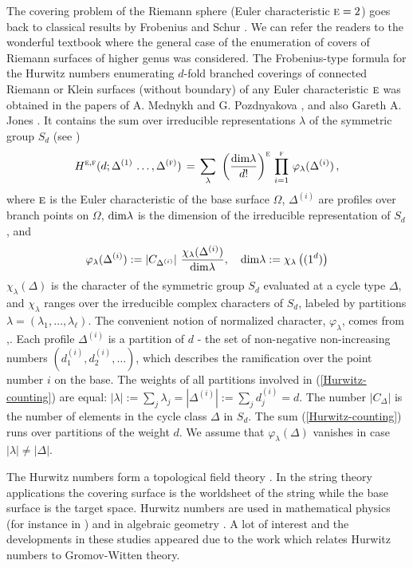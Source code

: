 \documentclass[a4paper,10pt]{article}
\theoremstyle{plain}
\theoremstyle{remark}
\def\be{\begin{equation}}
\def\ee{\end{equation}}
\begin{document}
The covering problem of the Riemann sphere (Euler characteristic $\textsc{e}=2$) goes back to classical results by Frobenius and
Schur \cite{F,FS}. We can refer the readers to the wonderful
textbook \cite{ZL} where the general case of the enumeration of covers of Riemann surfaces of higher genus was considered.
The Frobenius-type formula for the Hurwitz numbers enumerating $d$-fold branched coverings of connected Riemann or Klein
surfaces (without boundary) of any Euler characteristic $\textsc{e}$
was obtained in the papers of A. Mednykh and G. Pozdnyakova \cite{M1},\cite{M2}  and also Gareth A. Jones \cite{GARETH.A.JONES}.
 It contains the sum over irreducible representations
$\lambda$ of the symmetric group $S_d$ (see  \cite{F,FS,M1,M2,ZL,GARETH.A.JONES})
\be\label{Hurwitz-counting}
H^{\textsc{e},\textsc{f}}(d; \Delta^{(1)}\,\dots,\Delta^{(\textsc{f})})\,=\,
\sum_{\lambda} \,\,\left(\frac{{\rm dim}\lambda}{d!}\right)^\textsc{e}
\,
\prod_{i=1}^\textsc{f} \,\varphi_\lambda(\Delta^{(i)})\,,
\ee
where $\textsc{e}$ is the Euler characteristic of the base surface $\Omega$,
$\Delta^{(i)}$ are profiles  over branch points on $\Omega$,
${\rm dim}\lambda$ is the dimension of the irreducible representation of $S_d$, and
\be
\label{varphi}
\varphi_\lambda(\Delta^{(i)}) := |C_{\Delta^{(i)}}|\,\,\frac{\chi_\lambda(\Delta^{(i)})}{{\rm dim}\lambda} ,
\quad {\rm dim}\lambda:=\chi_\lambda\left((1^d)\right)
\ee
$\chi_\lambda(\Delta)$ is the character of the symmetric group $S_d$ evaluated at a cycle type $\Delta$,
and $\chi_\lambda$ ranges over the irreducible complex characters of $S_d$,
labeled by partitions $\lambda=(\lambda_1,\dots,\lambda_{\ell})$. The convenient notion of normalized character,
$\varphi_\lambda$, comes from \cite{Okounkov-2000},\cite{AMMN-2011}. Each
profile $\Delta^{(i)}$ is a partition of $d$ - the set of non-negative non-increasing numbers
$(d^{(i)}_1,d^{(i)}_2,\dots )$, which describes the ramification over the point number $i$ on the base. The weights
of all partitions involved in (\ref{Hurwitz-counting}) are equal:
$|\lambda|:=\sum_j\lambda_j=|\Delta^{(i)}|:=\sum_j d^{(i)}_j=d$. The number $|C_{\Delta}|$
is the number of elements in the cycle class $\Delta$ in $S_d$.
The sum (\ref{Hurwitz-counting}) runs over partitions of the weight $d$. We assume that
$\varphi_\lambda(\Delta)$ vanishes in case $|\lambda|\neq |\Delta|$.

The Hurwitz numbers form a topological field theory \cite{Dijkgraaf}. In the string theory applications the covering
surface is the worldsheet of the string while the base surface is the target space.
Hurwitz numbers are used in mathematical physics
(for instance in \cite{Dijkgraaf}) and in algebraic geometry \cite{ZL}. A lot of interest and the developments in
these studies appeared due to the work \cite{ELSV} which relates Hurwitz numbers to Gromov-Witten theory.
\end{document}
